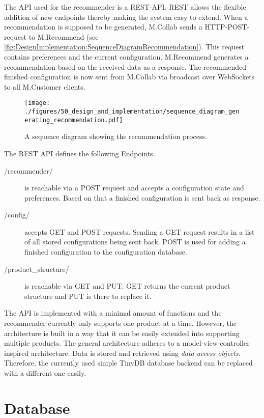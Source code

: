 The API used for the recommender is a REST-API. REST allows the flexible addition of new endpoints thereby making the system easy to extend.
When a recommendation is supposed to be generated, M.Collab sends a HTTP-POST-request to M.Recommend (see \autoref{fig:DesignImplementation:SequenceDiagramRecommendation}). This request contains preferences and the current configuration. M.Recommend generates a recommendation based on the received data as a response. The recommended finished configuration is now sent from  M.Collab via broadcast over WebSockets to all M.Customer clients. 

\begin{figure}
    \centering
    \texttt{[image: ./figures/50\_design\_and\_implementation/sequence\_diagram\_generating\_recommendation.pdf]}
    \caption[Sequence Diagram: Recommendation Generation]{A sequence diagram showing the recommendation process.}
    \label{fig:DesignImplementation:SequenceDiagramRecommendation}
\end{figure}

The REST API defines the following Endpoints.

\begin{description}
    \item[/recommender/] is reachable via a POST request and accepts a configuration state and preferences. Based on that a finished configuration is sent back as response.
    \item[/config/] accepts GET and POST requests. Sending a GET request results in a list of all stored configurations being sent back. POST is used for adding a finished configuration to the configuration database.
    \item[/product\_structure/] is reachable via GET and PUT. GET returns the current product structure and PUT is there to replace it.
\end{description}

The API is implemented with a minimal amount of functions and the recommender currently only supports one product at a time. However, the architecture is built in a way that it can be easily extended into supporting multiple products.
The general architecture adheres to a model-view-controller inspired architecture.
Data is stored and retrieved using \emph{data access objects}. Therefore, the currently used simple TinyDB database backend can be replaced with a different one easily.

\section{Database}
\label{sec:DesignImplementation:Database}

